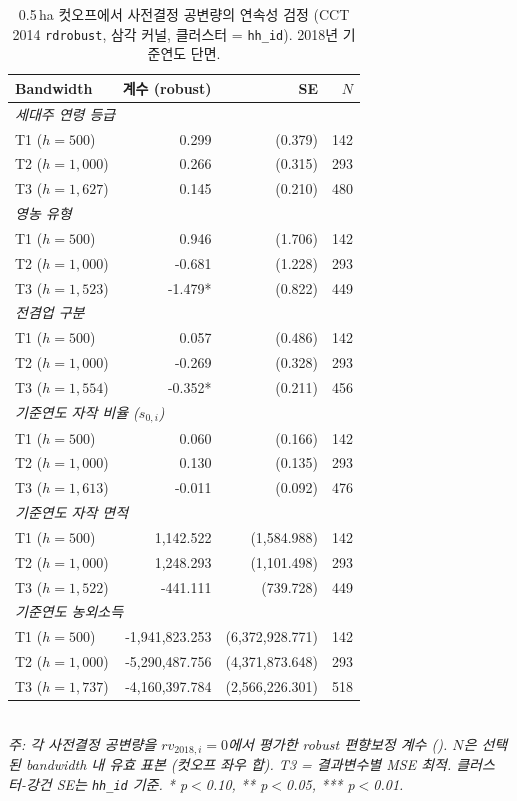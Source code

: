 \begin{table}[t]
\centering
\caption{0.5\,ha 컷오프에서 사전결정 공변량의 연속성 검정 (CCT 2014 \texttt{rdrobust}, 삼각 커널, 클러스터 = \texttt{hh\_id}). 2018년 기준연도 단면.}
\label{tab:cct_covariate_continuity_ko}
\begin{tabular}{lrrr}
\toprule
Bandwidth & 계수 (robust) & SE & $N$ \\
\midrule
\multicolumn{4}{l}{\textit{세대주 연령 등급}} \\
T1 ($h=500$) & 0.299 & (0.379) & 142 \\
T2 ($h=1,000$) & 0.266 & (0.315) & 293 \\
T3 ($h=1,627$) & 0.145 & (0.210) & 480 \\
\multicolumn{4}{l}{\textit{영농 유형}} \\
T1 ($h=500$) & 0.946 & (1.706) & 142 \\
T2 ($h=1,000$) & -0.681 & (1.228) & 293 \\
T3 ($h=1,523$) & -1.479* & (0.822) & 449 \\
\multicolumn{4}{l}{\textit{전\textperiodcentered{}겸업 구분}} \\
T1 ($h=500$) & 0.057 & (0.486) & 142 \\
T2 ($h=1,000$) & -0.269 & (0.328) & 293 \\
T3 ($h=1,554$) & -0.352* & (0.211) & 456 \\
\multicolumn{4}{l}{\textit{기준연도 자작 비율 ($s_{0,i}$)}} \\
T1 ($h=500$) & 0.060 & (0.166) & 142 \\
T2 ($h=1,000$) & 0.130 & (0.135) & 293 \\
T3 ($h=1,613$) & -0.011 & (0.092) & 476 \\
\multicolumn{4}{l}{\textit{기준연도 자작 면적}} \\
T1 ($h=500$) & 1,142.522 & (1,584.988) & 142 \\
T2 ($h=1,000$) & 1,248.293 & (1,101.498) & 293 \\
T3 ($h=1,522$) & -441.111 & (739.728) & 449 \\
\multicolumn{4}{l}{\textit{기준연도 농외소득}} \\
T1 ($h=500$) & -1,941,823.253 & (6,372,928.771) & 142 \\
T2 ($h=1,000$) & -5,290,487.756 & (4,371,873.648) & 293 \\
T3 ($h=1,737$) & -4,160,397.784 & (2,566,226.301) & 518 \\
\bottomrule
\end{tabular}
\\
\footnotesize\textit{주: 각 사전결정 공변량을 $rv_{2018,i} = 0$에서 평가한 robust 편향보정 계수 (\citealp{CalonicoCattaneoTitiunik2014_rdrobust}). $N$은 선택된 bandwidth 내 유효 표본 (컷오프 좌우 합). T3 = 결과변수별 MSE 최적. 클러스터-강건 SE는 \texttt{hh\_id} 기준. * p$<$0.10, ** p$<$0.05, *** p$<$0.01.}
\end{table}
